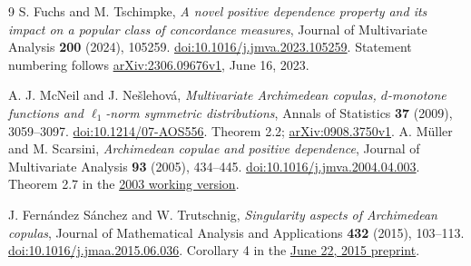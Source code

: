 \documentclass[11pt]{article}
\begin{document}
\begin{thebibliography}{9}
S. Fuchs and M. Tschimpke,
\emph{A novel positive dependence property and its impact on a popular
class of concordance measures},
Journal of Multivariate Analysis \textbf{200} (2024), 105259.
\href{https://doi.org/10.1016/j.jmva.2023.105259}{doi:10.1016/j.jmva.2023.105259}.
Statement numbering follows
\href{https://arxiv.org/abs/2306.09676v1}{arXiv:2306.09676v1}, June 16, 2023.

A. J. McNeil and J. Ne\v{s}lehov\'a,
\emph{Multivariate Archimedean copulas, $d$-monotone functions and
$\ell_1$-norm symmetric distributions},
Annals of Statistics \textbf{37} (2009), 3059--3097.
\href{https://doi.org/10.1214/07-AOS556}{doi:10.1214/07-AOS556}.
Theorem 2.2; \href{https://arxiv.org/abs/0908.3750v1}{arXiv:0908.3750v1}.
A. M\"uller and M. Scarsini,
\emph{Archimedean copulae and positive dependence},
Journal of Multivariate Analysis \textbf{93} (2005), 434--445.
\href{https://doi.org/10.1016/j.jmva.2004.04.003}{doi:10.1016/j.jmva.2004.04.003}.
Theorem 2.7 in the
\href{https://www.bemservizi.unito.it/repec/icr/wp2003/Scarsini25-03.pdf}{2003 working version}.

J. Fern\'andez S\'anchez and W. Trutschnig,
\emph{Singularity aspects of Archimedean copulas},
Journal of Mathematical Analysis and Applications \textbf{432} (2015), 103--113.
\href{https://doi.org/10.1016/j.jmaa.2015.06.036}{doi:10.1016/j.jmaa.2015.06.036}.
Corollary 4 in the \href{https://www.trutschnig.net/p21.pdf}{June 22, 2015 preprint}.
\end{thebibliography}
\end{document}
